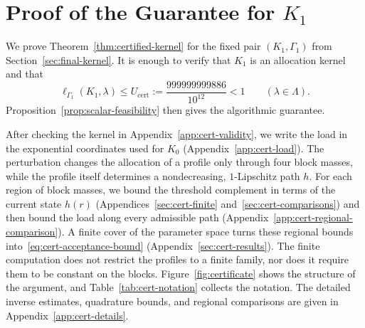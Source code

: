 \documentclass[11pt]{article}
\theoremstyle{definition}
\theoremstyle{remark}
\begin{document}
\section{Proof of the Guarantee for \texorpdfstring{$K_1$}{K1}}
\label{app:cert-proof}

We prove Theorem~\ref{thm:certified-kernel} for the fixed pair
$(K_1,\Gamma_1)$ from Section~\ref{sec:final-kernel}.
It is enough to verify that $K_1$ is an allocation kernel and that
\begin{equation}\label{eq:cert-acceptance-bound}
 \ell_{\Gamma_1}(K_1,\lambda)\le U_{\mathrm{cert}}
 :=\frac{999999999886}{10^{12}}<1
 \qquad(\lambda\in\Lambda).
\end{equation}
Proposition~\ref{prop:scalar-feasibility} then gives the algorithmic guarantee.

After checking the kernel in Appendix~\ref{app:cert-validity}, we write the load in the
exponential coordinates used for $K_0$ (Appendix~\ref{app:cert-load}). The perturbation
changes the allocation of a profile only through four block masses, while the profile itself
determines a nondecreasing, $1$-Lipschitz path $h$. For each region of block masses, we bound the threshold
complement in terms of the current state $h(r)$ (Appendices~\ref{sec:cert-finite}
and~\ref{sec:cert-comparisons}) and then bound the load along every admissible path
(Appendix~\ref{app:cert-regional-comparison}). A finite cover of the parameter space turns
these regional bounds into~\eqref{eq:cert-acceptance-bound} (Appendix~\ref{sec:cert-results}).
The finite computation does not restrict the profiles to a finite family, nor does it require
them to be constant on the blocks. Figure~\ref{fig:certificate} shows the structure of the
argument, and Table~\ref{tab:cert-notation} collects the notation. The detailed inverse
estimates, quadrature bounds, and regional comparisons are given in
Appendix~\ref{app:cert-details}.
\end{document}
